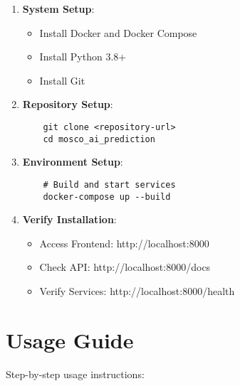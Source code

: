 \documentclass[12pt,a4paper]{report}
\begin{document}
\begin{enumerate}
    \item \textbf{System Setup}:
    \begin{itemize}
        \item Install Docker and Docker Compose
        \item Install Python 3.8+
        \item Install Git
    \end{itemize}
    
    \item \textbf{Repository Setup}:
    \begin{verbatim}
    git clone <repository-url>
    cd mosco_ai_prediction
    \end{verbatim}
    
    \item \textbf{Environment Setup}:
    \begin{verbatim}
    # Build and start services
    docker-compose up --build
    \end{verbatim}
    
    \item \textbf{Verify Installation}:
    \begin{itemize}
        \item Access Frontend: http://localhost:8000
        \item Check API: http://localhost:8000/docs
        \item Verify Services: http://localhost:8000/health
    \end{itemize}
\end{enumerate}

\section{Usage Guide}
Step-by-step usage instructions:
\end{document}
